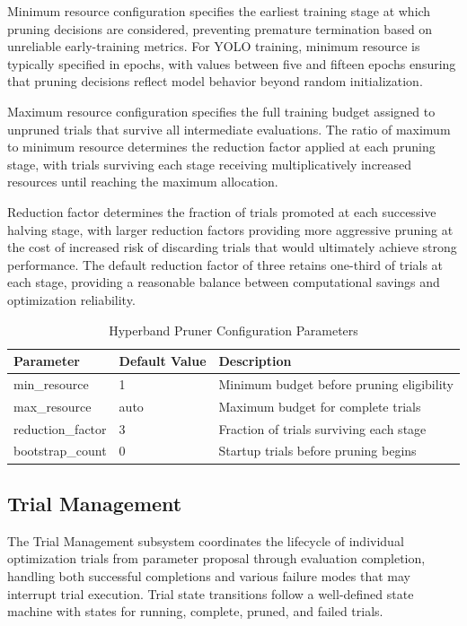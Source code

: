 Minimum resource configuration specifies the earliest training stage at which pruning decisions are considered, preventing premature termination based on unreliable early-training metrics. For YOLO training, minimum resource is typically specified in epochs, with values between five and fifteen epochs ensuring that pruning decisions reflect model behavior beyond random initialization.

Maximum resource configuration specifies the full training budget assigned to unpruned trials that survive all intermediate evaluations. The ratio of maximum to minimum resource determines the reduction factor applied at each pruning stage, with trials surviving each stage receiving multiplicatively increased resources until reaching the maximum allocation.

Reduction factor determines the fraction of trials promoted at each successive halving stage, with larger reduction factors providing more aggressive pruning at the cost of increased risk of discarding trials that would ultimately achieve strong performance. The default reduction factor of three retains one-third of trials at each stage, providing a reasonable balance between computational savings and optimization reliability.

\begin{table}[htbp]
\centering
\caption{Hyperband Pruner Configuration Parameters}
\label{tab:hyperband_config}
\begin{tabular}{p{3.5cm}p{3cm}p{6.5cm}}
\toprule
\textbf{Parameter} & \textbf{Default Value} & \textbf{Description} \\
\midrule
min\_resource & 1 & Minimum budget before pruning eligibility \\
max\_resource & auto & Maximum budget for complete trials \\
reduction\_factor & 3 & Fraction of trials surviving each stage \\
bootstrap\_count & 0 & Startup trials before pruning begins \\
\bottomrule
\end{tabular}
\end{table}

\subsection{Trial Management}

The Trial Management subsystem coordinates the lifecycle of individual optimization trials from parameter proposal through evaluation completion, handling both successful completions and various failure modes that may interrupt trial execution. Trial state transitions follow a well-defined state machine with states for running, complete, pruned, and failed trials.


